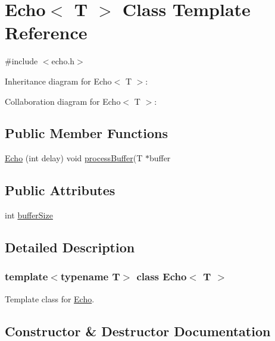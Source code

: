 \hypertarget{classEcho}{}\section{Echo$<$ T $>$ Class Template Reference}
\label{classEcho}


{\ttfamily \#include $<$echo.\+h$>$}



Inheritance diagram for Echo$<$ T $>$\+:


Collaboration diagram for Echo$<$ T $>$\+:
\subsection*{Public Member Functions}
\begin{DoxyCompactItemize}
\item 
\hyperlink{classEcho_ae5bf98df148d2dca4c182fbae3d1afaf}{Echo} (int delay) void \hyperlink{classProcessor_a401e57b59e43de9c4a51ca0f566d2948}{process\+Buffer}(T $\ast$buffer
\end{DoxyCompactItemize}
\subsection*{Public Attributes}
\begin{DoxyCompactItemize}
\item 
int \hyperlink{classEcho_a9d16563f717ea08d53f2fb5caf8631fb}{buffer\+Size}
\end{DoxyCompactItemize}


\subsection{Detailed Description}
\subsubsection*{template$<$typename T$>$\newline
class Echo$<$ T $>$}

Template class for \hyperlink{classEcho}{Echo}. 

\subsection{Constructor \& Destructor Documentation}
\mbox{\label{classEcho_ae5bf98df148d2dca4c182fbae3d1afaf}} 
